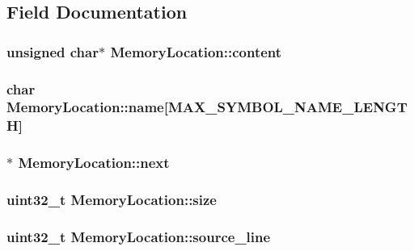\subsection{\-Field \-Documentation}
\hypertarget{struct_memory_location_afef0e80245b6dadee968d5d3dc6e5c5c}{
\subsubsection[{content}]{\setlength{\rightskip}{0pt plus 5cm}unsigned char$\ast$ {\bf \-Memory\-Location\-::content}}}
\label{struct_memory_location_afef0e80245b6dadee968d5d3dc6e5c5c}
\hypertarget{struct_memory_location_a320c498b87917320483f1ad58fe686a6}{
\subsubsection[{name}]{\setlength{\rightskip}{0pt plus 5cm}char {\bf \-Memory\-Location\-::name}\mbox{[}\-M\-A\-X\-\_\-\-S\-Y\-M\-B\-O\-L\-\_\-\-N\-A\-M\-E\-\_\-\-L\-E\-N\-G\-T\-H\mbox{]}}}
\label{struct_memory_location_a320c498b87917320483f1ad58fe686a6}
\hypertarget{struct_memory_location_adacbfac647a59503828b699744046177}{
\subsubsection[{next}]{$\ast$ {\bf \-Memory\-Location\-::next}}}
\label{struct_memory_location_adacbfac647a59503828b699744046177}
\hypertarget{struct_memory_location_aa261f98a2bc22ff9dd6ce65415bdbe9e}{
\subsubsection[{size}]{\setlength{\rightskip}{0pt plus 5cm}uint32\-\_\-t {\bf \-Memory\-Location\-::size}}}
\label{struct_memory_location_aa261f98a2bc22ff9dd6ce65415bdbe9e}
\hypertarget{struct_memory_location_ad8776d9c07ac1dfafd46fc571800268a}{
\subsubsection[{source\-\_\-line}]{\setlength{\rightskip}{0pt plus 5cm}uint32\-\_\-t {\bf \-Memory\-Location\-::source\-\_\-line}}}
